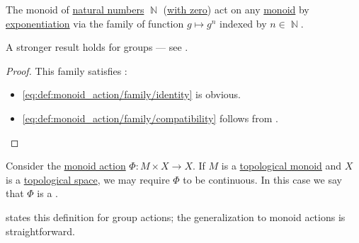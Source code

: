 \begin{proposition}\label{thm:exponentiation_monoid_action}
  The monoid of \hyperref[def:natural_numbers]{natural numbers} \( \BbbN \) (\hyperref[rem:peano_arithmetic_zero]{with zero}) act on any \hyperref[def:monoid]{monoid} by \hyperref[def:monoid/exponentiation]{exponentiation} via the family of function \( g \mapsto g^n \) indexed by \( n \in \BbbN \).
\end{proposition}
\begin{comments}
  \item A stronger result holds for groups --- see .
\end{comments}
\begin{proof}
  This family satisfies :
  \begin{itemize}
    \item \ref{eq:def:monoid_action/family/identity} is obvious.
    \item \ref{eq:def:monoid_action/family/compatibility} follows from .
  \end{itemize}
\end{proof}

\begin{definition}\label{def:continuous_monoid_action}
  Consider the \hyperref[def:monoid_action]{monoid action} \( \Phi: M \times X \to X \). If \( M \) is a \hyperref[def:topological_semigroup]{topological monoid} and \( X \) is a \hyperref[def:topological_space]{topological space}, we may require \( \Phi \) to be continuous. In this case we say that \( \Phi \) is a .
\end{definition}
\begin{comments}
  \item {} states this definition for group actions; the generalization to monoid actions is straightforward.
\end{comments}

